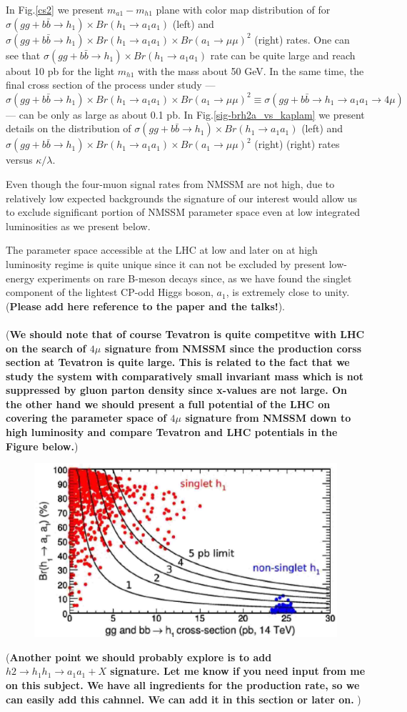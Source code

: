 \documentclass[aps,12pt,superscriptaddress,nofootinbib,floatfix,showpacs]{revtex4}
\begin{document}
In Fig.\ref{cs2} we present $m_{a1}-m_{h1}$ plane with
color map distribution of
for $\sigma(gg+b\bar{b}\to h_1)\times Br(h_1\to a_1 a_1)$ (left) 
and $\sigma(gg+b\bar{b}\to h_1)\times Br(h_1\to a_1 a_1)
\times Br(a_1\to \mu\mu)^2$ (right) rates. One can see that
$\sigma(gg+b\bar{b}\to h_1)\times Br(h_1\to a_1 a_1)$
rate can be quite large and reach about 10 pb for the light $m_{h1}$
with the mass about 50 GeV.
In the same time,
the final cross section of the process under study ---
$\sigma(gg+b\bar{b}\to h_1)\times Br(h_1\to a_1 a_1)
\times Br(a_1\to \mu\mu)^2 \equiv 
\sigma(gg+b\bar{b}\to h_1 \to a_1 a_1 \to 4\mu)$ ---
can be only as large as about 0.1 pb.
In Fig.\ref{sig-brh2a_vs_kaplam}
we present details on the distribution of
$\sigma(gg+b\bar{b}\to h_1)\times Br(h_1\to a_1 a_1)$ (left)
and 
$\sigma(gg+b\bar{b}\to h_1)\times Br(h_1\to a_1 a_1)
\times Br(a_1\to \mu\mu)^2$ (right) (right)
rates
versus  $\kappa/\lambda$.


Even though the four-muon signal rates from NMSSM are not high,
due to relatively low expected backgrounds the signature of our interest
would allow us to exclude significant portion of NMSSM parameter space 
even  at low integrated luminosities as we present below.

The parameter space accessible at the LHC at low and later on at high luminosity regime
is quite unique since it can not be excluded
by present low-energy experiments on rare B-meson decays since, as we have found
the singlet component of the lightest CP-odd Higgs boson, $a_1$,
is extremely close to unity.
({\bf Please  add here reference to the  paper and the talks!}).
\\
\\
({\bf We should note that of course Tevatron is quite competitve with LHC
on the search of $4\mu$ signature from NMSSM since
the production corss section at Tevatron is quite large.
This is related to the fact that we study the system with comparatively small
invariant mass which is not suppressed by gluon parton density
since x-values are not large.
On the other hand we should present a full potential of the LHC
on covering the parameter space of $4\mu$ signature from NMSSM 
down to high luminosity and compare Tevatron and LHC potentials
in the Figure below.})
\begin{figure}[h]
\includegraphics[width=0.5\linewidth]{plots/br_vs_cs.eps}%
\caption{
\label{}}
\end{figure}
({\bf Another point we should probably explore is to add 
     $h2\to h_1 h_1 \to a_1 a_1 + X$ signature. Let me know if you need input from me on this
     subject. We have all ingredients for the production rate, so we can easily add this cahnnel.
     We can add it in this section or later on.
     })
     
\end{document}
